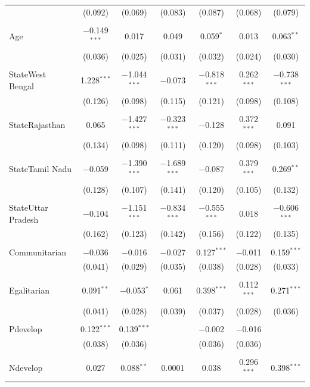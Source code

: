 \documentclass[
]{article}
\begin{document}
\begin{landscape}
\begin{table}[!htbp]
\begin{tabular}{@{\extracolsep{5pt}}lcccccc}
  & (0.092) & (0.069) & (0.083) & (0.087) & (0.068) & (0.079) \\ 
  & & & & & & \\ 
 Age & $-$0.149$^{***}$ & 0.017 & 0.049 & 0.059$^{*}$ & 0.013 & 0.063$^{**}$ \\ 
  & (0.036) & (0.025) & (0.031) & (0.032) & (0.024) & (0.030) \\ 
  & & & & & & \\ 
 StateWest Bengal & 1.228$^{***}$ & $-$1.044$^{***}$ & $-$0.073 & $-$0.818$^{***}$ & 0.262$^{***}$ & $-$0.738$^{***}$ \\ 
  & (0.126) & (0.098) & (0.115) & (0.121) & (0.098) & (0.108) \\ 
  & & & & & & \\ 
 StateRajasthan & 0.065 & $-$1.427$^{***}$ & $-$0.323$^{***}$ & $-$0.128 & 0.372$^{***}$ & 0.091 \\ 
  & (0.134) & (0.098) & (0.111) & (0.120) & (0.098) & (0.103) \\ 
  & & & & & & \\ 
 StateTamil Nadu & $-$0.059 & $-$1.390$^{***}$ & $-$1.689$^{***}$ & $-$0.087 & 0.379$^{***}$ & 0.269$^{**}$ \\ 
  & (0.128) & (0.107) & (0.141) & (0.120) & (0.105) & (0.132) \\ 
  & & & & & & \\ 
 StateUttar Pradesh & $-$0.104 & $-$1.151$^{***}$ & $-$0.834$^{***}$ & $-$0.555$^{***}$ & 0.018 & $-$0.606$^{***}$ \\ 
  & (0.162) & (0.123) & (0.142) & (0.156) & (0.122) & (0.135) \\ 
  & & & & & & \\ 
 Communitarian & $-$0.036 & $-$0.016 & $-$0.027 & 0.127$^{***}$ & $-$0.011 & 0.159$^{***}$ \\ 
  & (0.041) & (0.029) & (0.035) & (0.038) & (0.028) & (0.033) \\ 
  & & & & & & \\ 
 Egalitarian & 0.091$^{**}$ & $-$0.053$^{*}$ & 0.061 & 0.398$^{***}$ & 0.112$^{***}$ & 0.271$^{***}$ \\ 
  & (0.041) & (0.028) & (0.039) & (0.037) & (0.028) & (0.036) \\ 
  & & & & & & \\ 
 Pdevelop & 0.122$^{***}$ & 0.139$^{***}$ &  & $-$0.002 & $-$0.016 &  \\ 
  & (0.038) & (0.036) &  & (0.036) & (0.036) &  \\ 
  & & & & & & \\ 
 Ndevelop & 0.027 & 0.088$^{**}$ & 0.0001 & 0.038 & 0.296$^{***}$ & 0.398$^{***}$ \\ 

\end{tabular}
\end{table}
\end{landscape}
\end{document}
